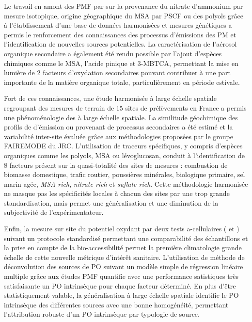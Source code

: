
Le travail en amont des PMF par sur la provenance du nitrate d'ammonium par mesure
isotopique, origine géographique du MSA par PSCF ou des polyols grâce à l'établissement
d'une base de données harmonisées et mesures génétiques a permis le renforcement des
connaissances des processus d'émissions des PM et l'identification de nouvelles sources
potentielles.
La caractérisation de l'aérosol organique secondaire a également été rendu possible par
l'ajout d'espèces chimiques comme le MSA, l'acide pinique et 3-MBTCA, permettant la mise
en lumière de 2 facteurs d'oxydation secondaires pouvant contribuer à une part importante
de la matière organique totale, particulièrement en période estivale.

Fort de ces connaissances, une étude harmonisée à large échelle spatiale regroupant des
mesures de terrain de 15 sites de prélèvements en France a permis une phénoménologie des
\PMdix{} à large échelle spatiale. La similitude géochimique des profils de d'émission ou
provenant de processus secondaires a été estimé et la variabilité inter-site évaluée grâce
aux méthodologies proposées par le groupe FAIREMODE du JRC. L'utilisation de traceurs
spécifiques, y compris d'espèces organiques comme les polyols, MSA ou lévoglucosan,
conduit à l'identification de 8 facteurs présent sur la quasi-totalité des sites de
mesures : combustion de biomasse domestique, trafic routier, poussières minérales,
biologique primaire, sel marin agée, \textit{MSA-rich}, \textit{nitrate-rich} et \textit{suflate-rich}.
Cette méthodologie harmonisée ne masque pas les spécificités locales à chacun des sites
par une trop grande standardisation, mais permet une généralisation et une diminution de
la subjectivité de l'expérimentateur.

Enfin, la mesure sur site du potentiel oxydant par deux tests a-cellulaires (\POAA{} et
\PODTT) suivant un protocole standardisé permettant une comparabilité des échantillons et
la prise en compte de la bio-accessibilité permet la première climatologie grande échelle
de cette nouvelle métrique d'intérêt sanitaire.
L'utilisation de méthode de déconvolution des sources de PO suivant un modèle simple de
régression linéaire multiple grâce aux études PMF quantifie avec une performance
satistiques très satisfaisante un PO intrinsèque pour chaque facteur déterminé.
En plus d'être statistiquement valable, la généralisation à large échelle spatiale
identifie le PO intrinsèque des différentes sources avec une bonne homogénéité, permettant
l'attribution robuste d'un PO intrinsèque par typologie de source.

